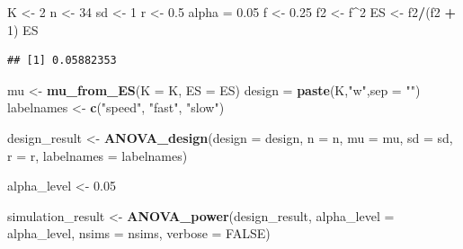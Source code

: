 \documentclass[]{book}
\newenvironment{Shaded}{\begin{snugshade}}{\end{snugshade}}
\newcommand{\DataTypeTok}[1]{\textcolor[rgb]{0.13,0.29,0.53}{#1}}
\newcommand{\DecValTok}[1]{\textcolor[rgb]{0.00,0.00,0.81}{#1}}
\newcommand{\FloatTok}[1]{\textcolor[rgb]{0.00,0.00,0.81}{#1}}
\newcommand{\KeywordTok}[1]{\textcolor[rgb]{0.13,0.29,0.53}{\textbf{#1}}}
\newcommand{\NormalTok}[1]{#1}
\newcommand{\OperatorTok}[1]{\textcolor[rgb]{0.81,0.36,0.00}{\textbf{#1}}}
\newcommand{\OtherTok}[1]{\textcolor[rgb]{0.56,0.35,0.01}{#1}}
\newcommand{\StringTok}[1]{\textcolor[rgb]{0.31,0.60,0.02}{#1}}
\begin{document}
\begin{Shaded}
\begin{Highlighting}[]
\NormalTok{K <-}\StringTok{ }\DecValTok{2}
\NormalTok{n <-}\StringTok{ }\DecValTok{34}
\NormalTok{sd <-}\StringTok{ }\DecValTok{1}
\NormalTok{r <-}\StringTok{ }\FloatTok{0.5}
\NormalTok{alpha =}\StringTok{ }\FloatTok{0.05}
\NormalTok{f <-}\StringTok{ }\FloatTok{0.25}
\NormalTok{f2 <-}\StringTok{ }\NormalTok{f}\OperatorTok{^}\DecValTok{2}
\NormalTok{ES <-}\StringTok{ }\NormalTok{f2}\OperatorTok{/}\NormalTok{(f2 }\OperatorTok{+}\StringTok{ }\DecValTok{1}\NormalTok{)}
\NormalTok{ES}
\end{Highlighting}
\end{Shaded}

\begin{verbatim}
## [1] 0.05882353
\end{verbatim}

\begin{Shaded}
\begin{Highlighting}[]
\NormalTok{mu <-}\StringTok{ }\KeywordTok{mu_from_ES}\NormalTok{(}\DataTypeTok{K =}\NormalTok{ K, }\DataTypeTok{ES =}\NormalTok{ ES)}
\NormalTok{design =}\StringTok{ }\KeywordTok{paste}\NormalTok{(K,}\StringTok{"w"}\NormalTok{,}\DataTypeTok{sep =} \StringTok{""}\NormalTok{)}
\NormalTok{labelnames <-}\StringTok{ }\KeywordTok{c}\NormalTok{(}\StringTok{"speed"}\NormalTok{, }\StringTok{"fast"}\NormalTok{, }\StringTok{"slow"}\NormalTok{)}

\NormalTok{design_result <-}\StringTok{ }\KeywordTok{ANOVA_design}\NormalTok{(}\DataTypeTok{design =}\NormalTok{ design,}
                   \DataTypeTok{n =}\NormalTok{ n, }
                   \DataTypeTok{mu =}\NormalTok{ mu, }
                   \DataTypeTok{sd =}\NormalTok{ sd, }
                   \DataTypeTok{r =}\NormalTok{ r, }
                   \DataTypeTok{labelnames =}\NormalTok{ labelnames)}

\NormalTok{alpha_level <-}\StringTok{ }\FloatTok{0.05}
\end{Highlighting}
\end{Shaded}

\begin{Shaded}
\begin{Highlighting}[]
\NormalTok{simulation_result <-}\StringTok{ }\KeywordTok{ANOVA_power}\NormalTok{(design_result, }
                                 \DataTypeTok{alpha_level =}\NormalTok{ alpha_level, }
                                 \DataTypeTok{nsims =}\NormalTok{ nsims,}
                                 \DataTypeTok{verbose =} \OtherTok{FALSE}\NormalTok{)}
\end{Highlighting}
\end{Shaded}
\end{document}
